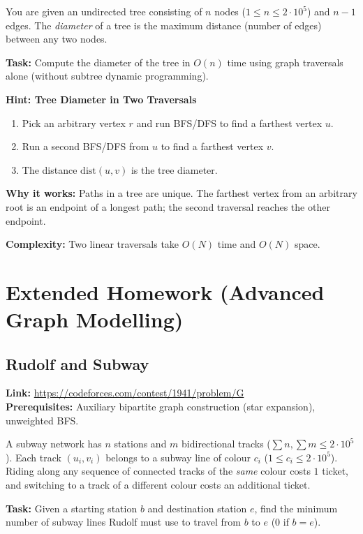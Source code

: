 \documentclass[12pt]{article}
\begin{document}
You are given an undirected tree consisting of $n$ nodes ($1 \le n \le 2 \cdot 10^5$) and $n - 1$ edges. The \textit{diameter} of a tree is the maximum distance (number of edges) between any two nodes.

\textbf{Task:} Compute the diameter of the tree in $O(n)$ time using graph traversals alone (without subtree dynamic programming).

\textbf{Hint: Tree Diameter in Two Traversals}

\begin{enumerate}
    \item Pick an arbitrary vertex $r$ and run BFS/DFS to find a farthest vertex $u$.
    \item Run a second BFS/DFS from $u$ to find a farthest vertex $v$.
    \item The distance $\text{dist}(u,v)$ is the tree diameter.
\end{enumerate}
\textbf{Why it works:} Paths in a tree are unique. The farthest vertex from an arbitrary root is an endpoint of a longest path; the second traversal reaches the other endpoint.

\textbf{Complexity:} Two linear traversals take $O(N)$ time and $O(N)$ space.

\section{Extended Homework (Advanced Graph Modelling)}

\subsection{Rudolf and Subway}
\textbf{Link:} \url{https://codeforces.com/contest/1941/problem/G} \\
\textbf{Prerequisites:} Auxiliary bipartite graph construction (star expansion), unweighted BFS.

A subway network has $n$ stations and $m$ bidirectional tracks ($\sum n, \sum m \le 2 \cdot 10^5$). Each track $(u_i, v_i)$ belongs to a subway line of colour $c_i$ ($1 \le c_i \le 2 \cdot 10^5$). Riding along any sequence of connected tracks of the \emph{same} colour costs $1$ ticket, and switching to a track of a different colour costs an additional ticket.

\textbf{Task:} Given a starting station $b$ and destination station $e$, find the minimum number of subway lines Rudolf must use to travel from $b$ to $e$ ($0$ if $b = e$).
\end{document}
